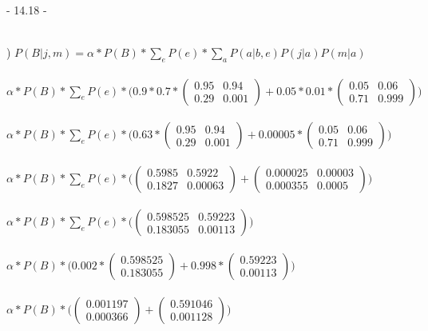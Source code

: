 \documentclass[12pt]{article}
\begin{document}
\centerline{- 14.18 - }
\ \\
) $P(B|j,m) = \alpha * P(B) *\sum_e P(e) *\sum_a P(a|b,e) P(j|a) P(m|a)$\\\\
\indent $\alpha * P(B) *\sum_e P(e) * \Big(0.9*0.7*\begin{pmatrix}0.95 & 0.94\\ 0.29 & 0.001\end{pmatrix} + 0.05*0.01*\begin{pmatrix}0.05 & 0.06\\ 0.71 & 0.999\end{pmatrix}\Big)$\\\\
\indent $\alpha * P(B) *\sum_e P(e) * \Big(0.63*\begin{pmatrix}0.95 & 0.94\\ 0.29 & 0.001\end{pmatrix} + 0.00005*\begin{pmatrix}0.05 & 0.06\\ 0.71 & 0.999\end{pmatrix}\Big)$\\\\
\indent $\alpha * P(B) *\sum_e P(e) * \Big(\begin{pmatrix}0.5985 & 0.5922\\ 0.1827 & 0.00063\end{pmatrix} + \begin{pmatrix}0.000025 & 0.00003\\ 0.000355 & 0.0005\end{pmatrix}\Big)$\\\\
\indent $\alpha * P(B) *\sum_e P(e) * \Big(\begin{pmatrix}0.598525 & 0.59223\\ 0.183055 & 0.00113\end{pmatrix}\Big)$\\\\
\indent $\alpha * P(B) *\Big(0.002 * \begin{pmatrix}0.598525 \\ 0.183055 \end{pmatrix}+0.998*\begin{pmatrix}0.59223 \\ 0.00113\end{pmatrix}\Big)$\\\\
\indent $\alpha * P(B) *\Big(\begin{pmatrix}0.001197 \\ 0.000366 \end{pmatrix}+\begin{pmatrix}0.591046 \\ 0.001128\end{pmatrix}\Big)$\\\\
\end{document}
